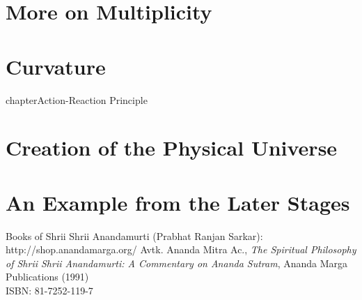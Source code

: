 \documentclass[12pt]{book}
\begin{document}
\chapter{More on Multiplicity}
%
\chapter{Curvature}
%
chapter{Action-Reaction Principle}
%
\chapter{Creation of the Physical Universe}
%
\chapter{An Example from the Later Stages}
%
\backmatter
%
\begin{thebibliography}{99}
Books of Shrii Shrii Anandamurti (Prabhat Ranjan Sarkar): \\
http://shop.anandamarga.org/
Avtk. Ananda Mitra Ac., \emph{The Spiritual Philosophy of Shrii Shrii Anandamurti: A Commentary on Ananda Sutram}, Ananda Marga Publications (1991) \\
ISBN: 81-7252-119-7
\end{thebibliography}
\end{document}
